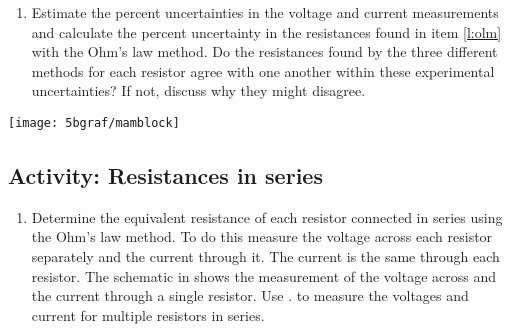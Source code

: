 \begin{multicols}{2}
\begin{enumerate}
	\item Estimate the percent uncertainties in the voltage and current measurements and calculate the percent uncertainty in the resistances found in item \ref{l:olm} with the Ohm's law method.  Do the resistances found by the three different methods for each resistor agree with one another within these experimental uncertainties? If not, discuss why they might disagree.
	
\end{enumerate}


\begin{center}
	\texttt{[image: 5bgraf/mamblock]} %
	\label{f:mamblock} %
\end{center}

\subsection{Activity: Resistances in series} \label{s:series}
\begin{enumerate}
	\item \label{l:eqs} Determine the equivalent resistance of each resistor connected in series using the Ohm's law method. To do this measure the voltage across each resistor separately and the current through it. The current is the same through each resistor. The schematic in  shows the measurement of the voltage across and the current through a single resistor. Use  . to measure the voltages and current for multiple resistors in series.
	

\end{enumerate}
\end{multicols}
